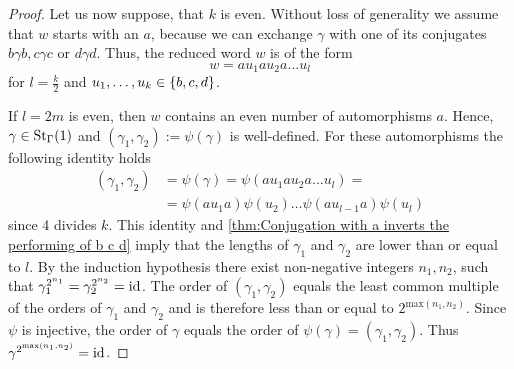 \begin{proof}
Let us now suppose, that $k$ is even. Without loss of generality we assume that $w$ starts with an $a$, because we can exchange $\gamma$ with one of its conjugates $b\gamma b, c\gamma c$ or $d\gamma d$. Thus, the reduced word $w$ is of the form
\begin{equation*}
w=au_1 a u_2 a\ldots u_l
\end{equation*}
for $l=\frac{k}{2}$ and $\seq[k]{u}\in\lbrace b,c,d\rbrace$.

If $l=2m$ is even, then $w$ contains an even number of automorphisms $a$. Hence, $\gamma\in\St[\Gamma]{1}$ and $(\gamma_1,\gamma_2):=\psi(\gamma)$ is well-defined. For these automorphisms the following identity holds
\begin{align*}
(\gamma_1,\gamma_2)&=\psi(\gamma)=\psi(au_1 a u_2 a\ldots u_l)=\\
	&=\psi(au_1 a)\psi(u_2)\ldots\psi(au_{l-1}a)\psi(u_l)
\end{align*}
since 4 divides $k$. This identity and \cref{thm:Conjugation with a inverts the performing of b c d} imply that the lengths of $\gamma_1$ and $\gamma_2$ are lower than or equal to $l$. By the induction hypothesis there exist non-negative integers $n_1,n_2$, such that $\gamma_1^{2^{n_1}}=\gamma_2^{2^{n_2}}=\id$. The order of $(\gamma_1,\gamma_2)$ equals the least common multiple of the orders of $\gamma_1$ and $\gamma_2$ and is therefore less than or equal to $2^{\mathrm{max}(n_1,n_2)}$. Since $\psi$ is injective, the order of $\gamma$ equals the order of $\psi(\gamma)=(\gamma_1,\gamma_2)$. Thus $\gamma^{2^{\mathrm{max}(n_1,n_2)}}=\id$.


\end{proof}
